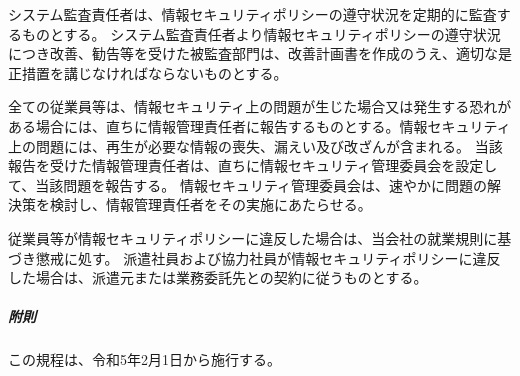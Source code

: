 \documentclass[10pt,a4paper,uplatex]{jsarticle}
\begin{document}
システム監査責任者は、情報セキュリティポリシーの遵守状況を定期的に監査するものとする。
\term システム監査責任者より情報セキュリティポリシーの遵守状況につき改善、勧告等を受けた被監査部門は、改善計画書を作成のうえ、適切な是正措置を講じなければならないものとする。

全ての従業員等は、情報セキュリティ上の問題が生じた場合又は発生する恐れがある場合には、直ちに情報管理責任者に報告するものとする。情報セキュリティ上の問題には、再生が必要な情報の喪失、漏えい及び改ざんが含まれる。
\term 当該報告を受けた情報管理責任者は、直ちに情報セキュリティ管理委員会を設定して、当該問題を報告する。
\term 情報セキュリティ管理委員会は、速やかに問題の解決策を検討し、情報管理責任者をその実施にあたらせる。

従業員等が情報セキュリティポリシーに違反した場合は、当会社の就業規則に基づき懲戒に処す。
\term 派遣社員および協力社員が情報セキュリティポリシーに違反した場合は、派遣元または業務委託先との契約に従うものとする。

\vspace{1cm}
\subparagraph{附則}
この規程は、令和5年2月1日から施行する。
\end{document}
